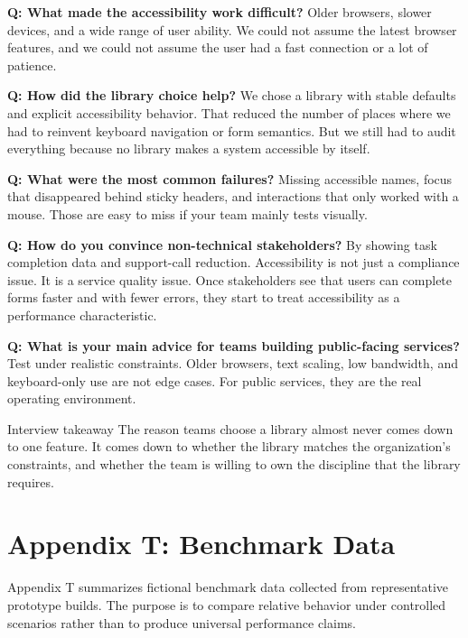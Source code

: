 \textbf{Q: What made the accessibility work difficult?}
Older browsers, slower devices, and a wide range of user ability. We could not assume the latest browser features, and we could not assume the user had a fast connection or a lot of patience.

\textbf{Q: How did the library choice help?}
We chose a library with stable defaults and explicit accessibility behavior. That reduced the number of places where we had to reinvent keyboard navigation or form semantics. But we still had to audit everything because no library makes a system accessible by itself.

\textbf{Q: What were the most common failures?}
Missing accessible names, focus that disappeared behind sticky headers, and interactions that only worked with a mouse. Those are easy to miss if your team mainly tests visually.

\textbf{Q: How do you convince non-technical stakeholders?}
By showing task completion data and support-call reduction. Accessibility is not just a compliance issue. It is a service quality issue. Once stakeholders see that users can complete forms faster and with fewer errors, they start to treat accessibility as a performance characteristic.

\textbf{Q: What is your main advice for teams building public-facing services?}
Test under realistic constraints. Older browsers, text scaling, low bandwidth, and keyboard-only use are not edge cases. For public services, they are the real operating environment.

\begin{highlightbox}{Interview takeaway}
The reason teams choose a library almost never comes down to one feature. It comes down to whether the library matches the organization's constraints, and whether the team is willing to own the discipline that the library requires.
\end{highlightbox}

\clearpage
{}
\section*{Appendix T: Benchmark Data}

Appendix T summarizes fictional benchmark data collected from representative prototype builds. The purpose is to compare relative behavior under controlled scenarios rather than to produce universal performance claims.

